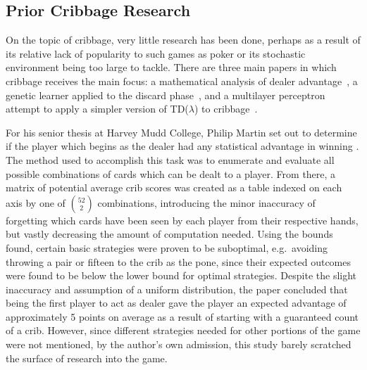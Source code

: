 
\subsection{Prior Cribbage Research}


On the topic of cribbage, very little research has been done,
perhaps as a result of its relative lack of popularity to such games as poker
or its stochastic environment being too large to tackle.
%
There are three main papers in which cribbage receives the main focus:
a mathematical analysis of dealer advantage~\cite{cribbage_optimal_ev},
a genetic learner applied to the discard phase~\cite{adaptive_cribbage},
and a multilayer perceptron attempt to apply a simpler version of TD($\lambda$)
to cribbage~\cite{roconnor_cs486}.

For his senior thesis at Harvey Mudd College,
Philip Martin set out to determine if the player which begins as the dealer
had any statistical advantage in winning
\cite{cribbage_optimal_ev}.
%
The method used to accomplish this task was to enumerate and evaluate all
possible combinations of cards which can be dealt to a player.
%
From there,
a matrix of potential average crib scores was created as a table indexed on each
axis by one of ${52 \choose 2}$ combinations,
introducing the minor inaccuracy of forgetting which cards have been seen by each
player from their respective hands,
but vastly decreasing the amount of computation needed.
%
Using the bounds found,
certain basic strategies were proven to be suboptimal,
e.g.\  avoiding throwing a pair or fifteen to the crib as the pone,
since their expected outcomes
were found to be below the lower bound for optimal strategies.
%
Despite the slight inaccuracy and assumption of a uniform distribution,
the paper concluded that being the first player to act as dealer gave the
player an expected advantage of approximately 5 points on average
as a result of starting with a guaranteed count of a crib.
%
However,
since different strategies needed for other portions of the game were not
mentioned,
by the author's own admission, this study barely scratched the surface of
research into the game.

